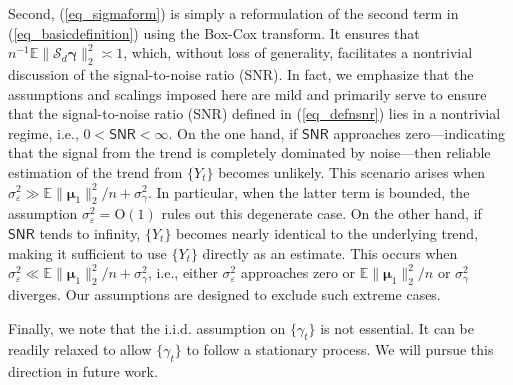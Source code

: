 \documentclass[11pt]{article}
\newcommand{\OO}{\mathrm{O}}
\newcommand{\SNR}{\mathsf{SNR}}
\newcommand{\calS}{\mathcal{S}}
\numberwithin{equation}{section}
\numberwithin{figure}{section}
\begin{document}
  
Second, (\ref{eq_sigmaform}) is simply a reformulation of the second term in (\ref{eq_basicdefinition}) using the Box-Cox transform. It ensures that $n^{-1}\mathbb{E}\|\calS_d \bm{\gamma}\|_2^2 \asymp 1$, which, without loss of generality, facilitates a nontrivial discussion of the signal-to-noise ratio (SNR). In fact, we emphasize that the assumptions and scalings imposed here are mild and primarily serve to ensure that the signal-to-noise ratio (SNR) defined in (\ref{eq_defnsnr}) lies in a nontrivial regime, i.e., $0 < \SNR < \infty$. On the one hand, if $\SNR$ approaches zero—indicating that the signal from the trend is completely dominated by noise—then reliable estimation of the trend from $\{Y_t\}$ becomes unlikely. This scenario arises when $\sigma^2_\varepsilon \gg \mathbb{E}\| \bm{\mu}_1 \|_2^2 / n + \sigma_\gamma^2$. In particular, when the latter term is bounded, the assumption $\sigma^2_\varepsilon = \OO(1)$ rules out this degenerate case. On the other hand, if $\SNR$ tends to infinity, $\{Y_t\}$ becomes nearly identical to the underlying trend, making it sufficient to use $\{Y_t\}$ directly as an estimate. This occurs when $\sigma^2_\varepsilon \ll \mathbb{E}\| \bm{\mu}_1 \|_2^2 / n + \sigma_\gamma^2$, i.e., either $\sigma^2_\varepsilon$ approaches zero or $\mathbb{E}\| \bm{\mu}_1 \|_2^2 / n$ or $\sigma_\gamma^2$ diverges. Our assumptions are designed to exclude such extreme cases.



Finally, we note that the i.i.d. assumption on $\{\gamma_t\}$ is not essential. It can be readily relaxed to allow $\{\gamma_t\}$ to follow a stationary process. We will pursue this direction in future work.

\end{document}
